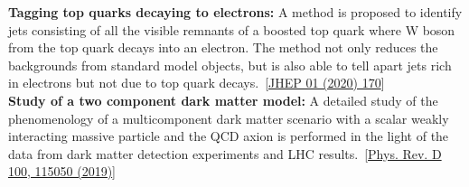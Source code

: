 \documentclass[a4paper,11pt]{article}
\begin{document}
{\textbf{Tagging top quarks decaying to electrons:}
A method is proposed to identify jets consisting of all the visible remnants of a boosted top quark where W boson from the top quark decays into an electron. The method not only reduces the backgrounds from standard model objects, but is also able to tell apart jets rich in electrons but not due to top quark decays.~[\href{https://doi.org/10.1007/JHEP01(2020)170}{JHEP 01 (2020) 170}]\\
\textbf{Study of a two component dark matter model:}
A detailed study of the phenomenology of a multicomponent dark matter scenario with a scalar weakly interacting massive particle and the QCD axion is performed in the light of the data from dark matter detection experiments and LHC results.~[\href{https://doi.org/10.1103/PhysRevD.100.115050}{Phys. Rev. D 100, 115050 (2019)}]

}
\end{document}
